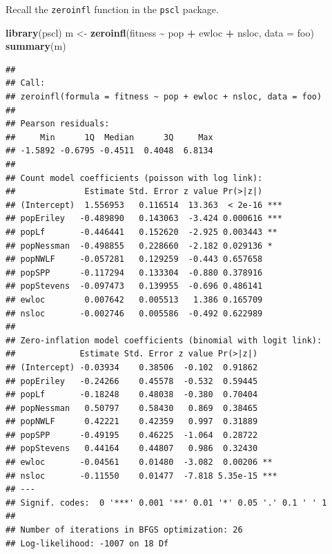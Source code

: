 \documentclass[
  ignorenonframetext,
]{beamer}
\newenvironment{Shaded}{\begin{snugshade}}{\end{snugshade}}
\newcommand{\AttributeTok}[1]{\textcolor[rgb]{0.13,0.29,0.53}{#1}}
\newcommand{\FunctionTok}[1]{\textcolor[rgb]{0.13,0.29,0.53}{\textbf{#1}}}
\newcommand{\NormalTok}[1]{#1}
\newcommand{\OtherTok}[1]{\textcolor[rgb]{0.56,0.35,0.01}{#1}}
\newcommand{\SpecialCharTok}[1]{\textcolor[rgb]{0.81,0.36,0.00}{\textbf{#1}}}
\begin{document}
\begin{frame}[fragile]{}
\protect\hypertarget{section-42}{}
Recall the \texttt{zeroinfl} function in the \texttt{pscl} package.

\vspace{12pt}
\tiny

\begin{Shaded}
\begin{Highlighting}[]
\FunctionTok{library}\NormalTok{(pscl)}
\NormalTok{m }\OtherTok{\textless{}{-}} \FunctionTok{zeroinfl}\NormalTok{(fitness }\SpecialCharTok{\textasciitilde{}}\NormalTok{ pop }\SpecialCharTok{+}\NormalTok{ ewloc }\SpecialCharTok{+}\NormalTok{ nsloc, }\AttributeTok{data =}\NormalTok{ foo)}
\FunctionTok{summary}\NormalTok{(m)}
\end{Highlighting}
\end{Shaded}

\begin{verbatim}
## 
## Call:
## zeroinfl(formula = fitness ~ pop + ewloc + nsloc, data = foo)
## 
## Pearson residuals:
##     Min      1Q  Median      3Q     Max 
## -1.5892 -0.6795 -0.4511  0.4048  6.8134 
## 
## Count model coefficients (poisson with log link):
##              Estimate Std. Error z value Pr(>|z|)    
## (Intercept)  1.556953   0.116514  13.363  < 2e-16 ***
## popEriley   -0.489890   0.143063  -3.424 0.000616 ***
## popLf       -0.446441   0.152620  -2.925 0.003443 ** 
## popNessman  -0.498855   0.228660  -2.182 0.029136 *  
## popNWLF     -0.057281   0.129259  -0.443 0.657658    
## popSPP      -0.117294   0.133304  -0.880 0.378916    
## popStevens  -0.097473   0.139955  -0.696 0.486141    
## ewloc        0.007642   0.005513   1.386 0.165709    
## nsloc       -0.002746   0.005586  -0.492 0.622989    
## 
## Zero-inflation model coefficients (binomial with logit link):
##             Estimate Std. Error z value Pr(>|z|)    
## (Intercept) -0.03934    0.38506  -0.102  0.91862    
## popEriley   -0.24266    0.45578  -0.532  0.59445    
## popLf       -0.18248    0.48038  -0.380  0.70404    
## popNessman   0.50797    0.58430   0.869  0.38465    
## popNWLF      0.42221    0.42359   0.997  0.31889    
## popSPP      -0.49195    0.46225  -1.064  0.28722    
## popStevens   0.44164    0.44807   0.986  0.32430    
## ewloc       -0.04561    0.01480  -3.082  0.00206 ** 
## nsloc       -0.11550    0.01477  -7.818 5.35e-15 ***
## ---
## Signif. codes:  0 '***' 0.001 '**' 0.01 '*' 0.05 '.' 0.1 ' ' 1 
## 
## Number of iterations in BFGS optimization: 26 
## Log-likelihood: -1007 on 18 Df
\end{verbatim}
\end{frame}
\end{document}
